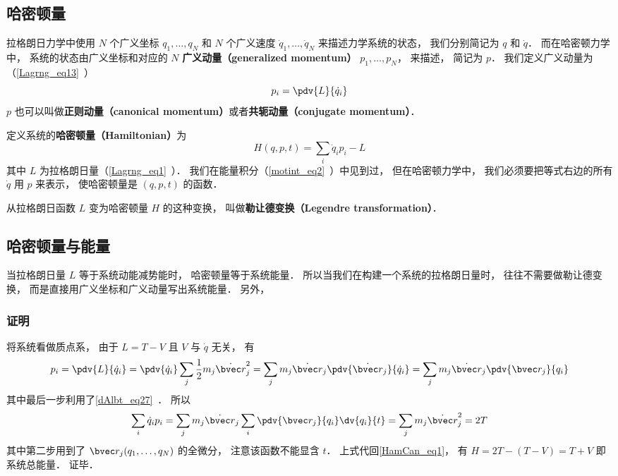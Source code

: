 

\subsection{哈密顿量}
拉格朗日力学中使用 $N$ 个广义坐标 $q_1,\dots,q_N$ 和 $N$ 个广义速度 $\dot q_1,\dots,\dot q_N$ 来描述力学系统的状态， 我们分别简记为 $q$ 和 $\dot q$． 而在哈密顿力学中， 系统的状态由广义坐标和对应的 $N$ \textbf{广义动量（generalized momentum）} $p_1, \dots, p_N$， 来描述， 简记为 $p$． 我们定义广义动量为（\autoref{Lagrng_eq13}~）
\begin{equation}
p_i = \pdv{L}{\dot q_i}
\end{equation}
$p$ 也可以叫做\textbf{正则动量（canonical momentum）}或者\textbf{共轭动量（conjugate momentum）}．

定义系统的\textbf{哈密顿量（Hamiltonian）}为
\begin{equation}\label{HamCan_eq1}
H(q,p,t) = \sum_i \dot q_i p_i - L
\end{equation}
其中 $L$ 为拉格朗日量（\autoref{Lagrng_eq1}~）． 我们在能量积分（\autoref{motint_eq2}~）中见到过， 但在哈密顿力学中， 我们必须要把等式右边的所有 $\dot q$ 用 $p$ 来表示， 使哈密顿量是 $(q,p,t)$ 的函数．

从拉格朗日函数 $L$ 变为哈密顿量 $H$ 的这种变换， 叫做\textbf{勒让德变换（Legendre transformation）}．

\subsection{哈密顿量与能量}
当拉格朗日量 $L$ 等于系统动能减势能时， 哈密顿量等于系统能量． 所以当我们在构建一个系统的拉格朗日量时， 往往不需要做勒让德变换， 而是直接用广义坐标和广义动量写出系统能量． 另外， 

\subsubsection{证明}
将系统看做质点系， 由于 $L = T - V$ 且 $V$ 与 $\dot q$ 无关， 有
\begin{equation}
p_i = \pdv{L}{\dot q_i} = \pdv{\dot q_i} \sum_j \frac12 m_j \dot{\bvec r}_j^2
= \sum_j m_j \dot{\bvec r}_j \pdv{\dot{\bvec r}_j}{\dot q_i}
= \sum_j m_j \dot{\bvec r}_j  \pdv{\bvec r_j}{q_i}
\end{equation}
其中最后一步利用了\autoref{dAlbt_eq27}~． 所以
\begin{equation}
 \sum_i \dot q_i p_i = \sum_j m_j \dot{\bvec r}_j \sum_i \pdv{\bvec r_j}{q_i}\dv{q_i}{t}
= \sum_j m_j \dot{\bvec r}_j^2 = 2T
\end{equation}
其中第二步用到了 $\bvec r_j(q_1,\dots,q_N)$ 的全微分， 注意该函数不能显含 $t$． 上式代回\autoref{HamCan_eq1}， 有 $H = 2T - (T - V) = T + V$ 即系统总能量． 证毕．


